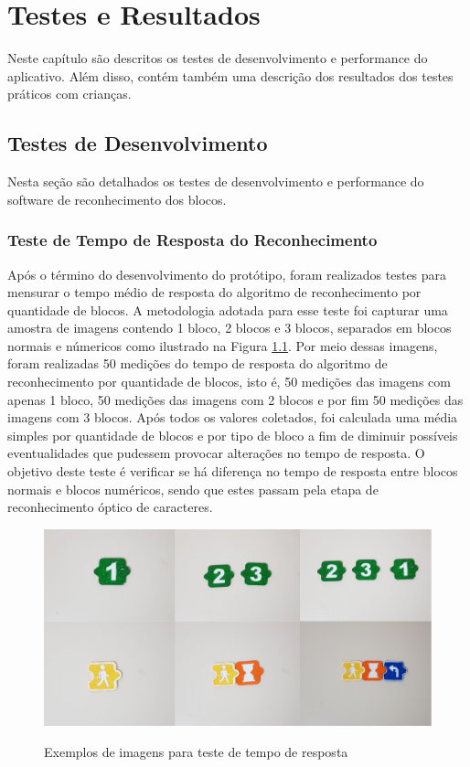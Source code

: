 \chapter{Testes e Resultados}\label{cap:testes_e_resultados}
Neste capítulo são descritos os testes de desenvolvimento e performance do aplicativo. Além disso, contém também uma descrição dos resultados dos testes práticos com crianças.

\section{Testes de Desenvolvimento}

Nesta seção são detalhados os testes de desenvolvimento e performance do software de reconhecimento dos blocos.


\subsection{\textbf{Teste de Tempo de Resposta do Reconhecimento}}

Após o término do desenvolvimento do protótipo, foram realizados testes para mensurar o tempo médio de resposta do algoritmo de reconhecimento por quantidade de blocos. A metodologia adotada para esse teste foi capturar uma amostra de imagens contendo 1 bloco, 2 blocos e 3 blocos, separados em blocos normais e númericos como ilustrado na Figura \ref{figura:ttr}. Por meio dessas imagens, foram realizadas 50 medições do tempo de resposta do algoritmo de reconhecimento por quantidade de blocos, isto é, 50 medições das imagens com apenas 1 bloco, 50 medições das imagens com 2 blocos e por fim 50 medições das imagens com 3 blocos. Após todos os valores coletados, foi calculada uma média simples por quantidade de blocos e por tipo de bloco a fim de diminuir possíveis eventualidades que pudessem provocar alterações no tempo de resposta. O objetivo deste teste é verificar se há diferença no tempo de resposta entre blocos normais e blocos numéricos, sendo que estes passam pela etapa de reconhecimento óptico de caracteres.

\begin{figure}[H]
    \caption{Exemplos de imagens para teste de tempo de resposta}
    \centering
    \includegraphics[width=15cm]{Imagens/Cap5/ttr.png}
    \label{figura:ttr}
\end{figure}

